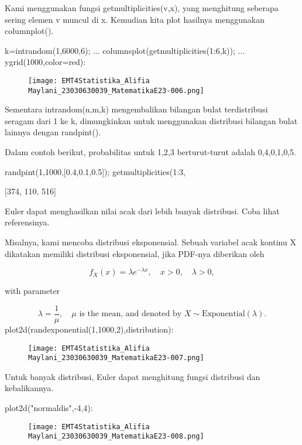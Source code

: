 \documentclass{article}
\begin{document}
Kami menggunakan fungsi getmultiplicities(v,x), yang menghitung
seberapa sering elemen v muncul di x. Kemudian kita plot hasilnya
menggunakan columnplot().


\>k=intrandom(1,6000,6);  ...  
\>   columnsplot(getmultiplicities(1:6,k));  ...  
\>   ygrid(1000,color=red):


\begin{figure}
    \centering
    \texttt{[image: EMT4Statistika\_Alifia Maylani\_23030630039\_MatematikaE23-006.png]}
    \caption{}
    \label{fig:enter-label}
\end{figure}

Sementara intrandom(n,m,k) mengembalikan bilangan bulat terdistribusi
seragam dari 1 ke k, dimungkinkan untuk menggunakan distribusi
bilangan bulat lainnya dengan randpint().


Dalam contoh berikut, probabilitas untuk 1,2,3 berturut-turut adalah
0,4,0,1,0,5.


\>randpint(1,1000,[0.4,0.1,0.5]); getmultiplicities(1:3,%


    [374,  110,  516]

Euler dapat menghasilkan nilai acak dari lebih banyak distribusi. Coba
lihat referensinya.


Misalnya, kami mencoba distribusi eksponensial. Sebuah variabel acak
kontinu X dikatakan memiliki distribusi eksponensial, jika PDF-nya
diberikan oleh


$$f_X(x)=\lambda e^{-\lambda x},\quad x>0,\quad \lambda>0,$$

with parameter


$$\lambda=\frac{1}{\mu},\quad \mu \text{ is the mean, and denoted by } X \sim \text{Exponential}(\lambda).$$\>plot2d(randexponential(1,1000,2),\>distribution):


\begin{figure}
    \centering
    \texttt{[image: EMT4Statistika\_Alifia Maylani\_23030630039\_MatematikaE23-007.png]}
    \caption{}
    \label{fig:enter-label}
\end{figure}

Untuk banyak distribusi, Euler dapat menghitung fungsi distribusi dan
kebalikannya.


\>plot2d("normaldis",-4,4): 


\begin{figure}
    \centering
    \texttt{[image: EMT4Statistika\_Alifia Maylani\_23030630039\_MatematikaE23-008.png]}
    \caption{}
    \label{fig:enter-label}
\end{figure}
\end{document}

